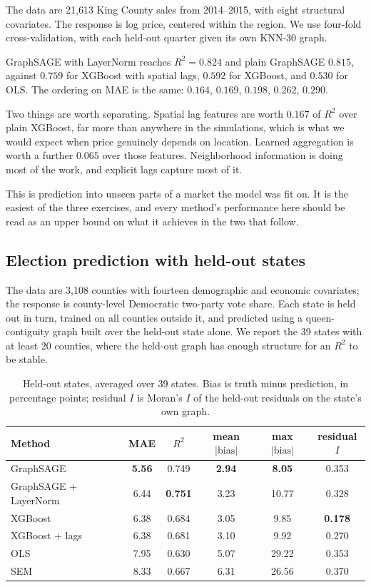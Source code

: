 \documentclass[ASNA, twocolumn]{USG} %
\begin{document}
The data are 21,613 King County sales from 2014--2015, with eight structural covariates. The response is log price, centered within the region. We use four-fold cross-validation, with each held-out quarter given its own KNN-30 graph.

GraphSAGE with LayerNorm reaches \(R^2=0.824\) and plain GraphSAGE \(0.815\), against \(0.759\) for XGBoost with spatial lags, \(0.592\) for XGBoost, and \(0.530\) for OLS. The ordering on MAE is the same: \(0.164\), \(0.169\), \(0.198\), \(0.262\), \(0.290\).

Two things are worth separating. Spatial lag features are worth \(0.167\) of \(R^2\) over plain XGBoost, far more than anywhere in the simulations, which is what we would expect when price genuinely depends on location. Learned aggregation is worth a further \(0.065\) over those features. Neighborhood information is doing most of the work, and explicit lags capture most of it.

This is prediction into unseen parts of a market the model was fit on. It is the easiest of the three exercises, and every method's performance here should be read as an upper bound on what it achieves in the two that follow.

\subsection{Election prediction with held-out states}

The data are 3,108 counties with fourteen demographic and economic covariates; the response is county-level Democratic two-party vote share. Each state is held out in turn, trained on all counties outside it, and predicted using a queen-contiguity graph built over the held-out state alone. We report the 39 states with at least 20 counties, where the held-out graph has enough structure for an \(R^2\) to be stable.

\begin{table}[t]
\centering
\caption{Held-out states, averaged over 39 states. Bias is truth minus prediction, in percentage points; residual \(I\) is Moran's \(I\) of the held-out residuals on the state's own graph.}
\label{tab:states}
\begin{tabular}{lccccc}
\toprule
Method & MAE & \(R^2\) & mean \(|\text{bias}|\) & max \(|\text{bias}|\) & residual \(I\) \\
\midrule
GraphSAGE & \textbf{5.56} & 0.749 & \textbf{2.94} & \textbf{8.05} & 0.353 \\
GraphSAGE + LayerNorm & 6.44 & \textbf{0.751} & 3.23 & 10.77 & 0.328 \\
XGBoost & 6.38 & 0.684 & 3.05 & 9.85 & \textbf{0.178} \\
XGBoost + lags & 6.38 & 0.681 & 3.10 & 9.92 & 0.270 \\
OLS & 7.95 & 0.630 & 5.07 & 29.22 & 0.353 \\
SEM & 8.33 & 0.667 & 6.31 & 26.56 & 0.370 \\
\bottomrule
\end{tabular}
\end{table}
\end{document}
